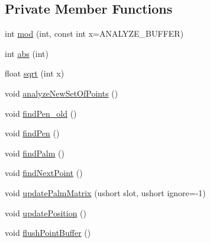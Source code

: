 \subsection*{Private Member Functions}
\begin{DoxyCompactItemize}
\item 
int \hyperlink{classPalmRejection_acecee9d679d22637d219a55d6db2421f}{mod} (int, const int x=ANALYZE\_\-BUFFER)
\item 
int \hyperlink{classPalmRejection_a3e2b4d2e26c56ac504847096b9b991c6}{abs} (int)
\item 
float \hyperlink{classPalmRejection_aa9a6e18b77805ae5cc32e56896191c20}{sqrt} (int x)
\item 
void \hyperlink{classPalmRejection_a2e56fb3aab93650900ab7ba4f14e6507}{analyzeNewSetOfPoints} ()
\item 
void \hyperlink{classPalmRejection_a2ae92b6a2be26fdfaa4b8cf848f4f6fe}{findPen\_\-old} ()
\item 
void \hyperlink{classPalmRejection_a948d8d4d9123b8c926e72226df3a29c5}{findPen} ()
\item 
void \hyperlink{classPalmRejection_aa1bb74f3b45634d99796274c320dafd0}{findPalm} ()
\item 
void \hyperlink{classPalmRejection_ac3474032f6f0919c4857c010e4da0b78}{findNextPoint} ()
\item 
void \hyperlink{classPalmRejection_a18a1e21af78e44b8c80bdb5c4ceab1fb}{updatePalmMatrix} (ushort slot, ushort ignore=-\/1)
\item 
void \hyperlink{classPalmRejection_af65e48ab71b1414d79a02d36345cc630}{updatePosition} ()
\item 
void \hyperlink{classPalmRejection_a20bea4c32f648e75a448e0ad8bfb3080}{flushPointBuffer} ()
\end{DoxyCompactItemize}
